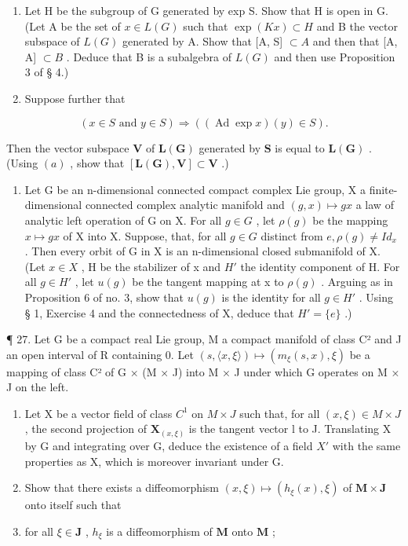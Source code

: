 \begin{enumerate}
\def\labelenumi{(\alph{enumi})}
\item
  Let H be the subgroup of G generated by exp S. Show that H is open in G. (Let A be the set of \(x \in L(G)\) such that \(\exp(Kx) \subset H\) and B the vector subspace of \(L(G)\) generated by A. Show that {[}A, S{]} \(\subset A\) and then that {[}A, A{]} \(\subset B\) . Deduce that B is a subalgebra of \(L(G)\) and then use Proposition 3 of § 4.)
\item
  Suppose further that
\end{enumerate}

\[
(x \in S \text {   and   } y \in S) \Rightarrow ((\operatorname{Ad} \exp x) (y) \in S).
\]

Then the vector subspace \(\mathbf{V}\) of \(\mathbf{L}(\mathbf{G})\) generated by \(\mathbf{S}\) is equal to \(\mathbf{L}(\mathbf{G})\) . (Using \((a)\) , show that \([\mathbf{L}(\mathbf{G}), \mathbf{V}] \subset \mathbf{V}\) .)

\begin{enumerate}
\def\labelenumi{\arabic{enumi}.}
\setcounter{enumi}{25}
\tightlist
\item
  Let G be an n-dimensional connected compact complex Lie group, X a finite-dimensional connected complex analytic manifold and \((g, x) \mapsto gx\) a law of analytic left operation of G on X. For all \(g \in G\) , let \(\rho(g)\) be the mapping \(x \mapsto gx\) of X into X. Suppose, that, for all \(g \in G\) distinct from \(e, \rho(g) \neq Id_x\) . Then every orbit of G in X is an n-dimensional closed submanifold of X. (Let \(x \in X\) , H be the stabilizer of x and \(H'\) the identity component of H. For all \(g \in H'\) , let \(u(g)\) be the tangent mapping at x to \(\rho(g)\) . Arguing as in Proposition 6 of no. 3, show that \(u(g)\) is the identity for all \(g \in H'\) . Using § 1, Exercise 4 and the connectedness of X, deduce that \(H' = \{e\}\) .)
\end{enumerate}

¶ 27. Let G be a compact real Lie group, M a compact manifold of class C² and J an open interval of R containing 0. Let \((s, \langle x, \xi \rangle) \mapsto (m_{\xi}(s, x), \xi)\) be a mapping of class C² of G × (M × J) into M × J under which G operates on M × J on the left.

\begin{enumerate}
\def\labelenumi{(\alph{enumi})}
\item
  Let X be a vector field of class \(C^{1}\) on \(M \times J\) such that, for all \((x, \xi) \in M \times J\) , the second projection of \(\mathbf{X}_{(x, \xi)}\) is the tangent vector l to J. Translating X by G and integrating over G, deduce the existence of a field \(X'\) with the same properties as X, which is moreover invariant under G.
\item
  Show that there exists a diffeomorphism \((x, \xi) \mapsto (h_{\xi}(x), \xi)\) of \(\mathbf{M} \times \mathbf{J}\) onto itself such that
\item
  for all \(\xi \in \mathbf{J}\) , \(h_{\xi}\) is a diffeomorphism of \(\mathbf{M}\) onto \(\mathbf{M}\) ;
\end{enumerate}

